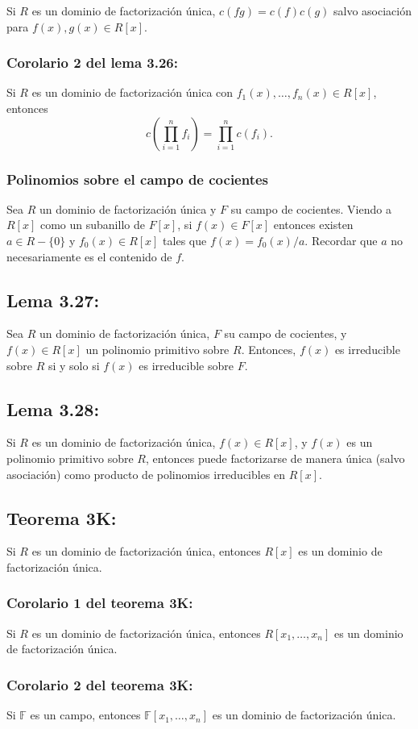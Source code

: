 \documentclass{article}
\begin{document}
Si $R$ es un dominio de factorización única, $c(fg)=c(f)c(g)$ salvo asociación para $f(x),g(x)\in R[x]$.

\subsubsection*{\color{blue} Corolario 2 del lema 3.26:}

Si $R$ es un dominio de factorización única con $f_1(x),\ldots,f_n(x)\in R[x]$, entonces
$$c\left(\prod_{i=1}^n f_i\right)=\prod_{i=1}^n c(f_i).$$

\subsubsection*{\color{purple} Polinomios sobre el campo de cocientes}

Sea $R$ un dominio de factorización única y $F$ su campo de cocientes. Viendo a $R[x]$ como un subanillo de $F[x]$, si $f(x)\in F[x]$ entonces existen $a\in R-\{0\}$ y $f_0(x)\in R[x]$ tales que $f(x)=f_0(x)/a$. Recordar que $a$ no necesariamente es el contenido de $f$.

\subsection*{\color{blue} Lema 3.27:}

Sea $R$ un dominio de factorización única, $F$ su campo de cocientes, y $f(x)\in R[x]$ un polinomio primitivo sobre $R$. Entonces, $f(x)$ es irreducible sobre $R$ si y solo si $f(x)$ es irreducible sobre $F$.

\subsection*{\color{blue} Lema 3.28:}

Si $R$ es un dominio de factorización única, $f(x)\in R[x]$, y $f(x)$ es un polinomio primitivo sobre $R$, entonces puede factorizarse de manera única (salvo asociación) como producto de polinomios irreducibles en $R[x]$.

\subsection*{\color{red} Teorema 3K:}

Si $R$ es un dominio de factorización única, entonces $R[x]$ es un dominio de factorización única.

\subsubsection*{\color{red} Corolario 1 del teorema 3K:}

Si $R$ es un dominio de factorización única, entonces $R[x_1,\ldots,x_n]$ es un dominio de factorización única.

\subsubsection*{\color{red} Corolario 2 del teorema 3K:}

Si $\mathbb{F}$ es un campo, entonces $\mathbb{F}[x_1,\ldots,x_n]$ es un dominio de factorización única.
\end{document}
